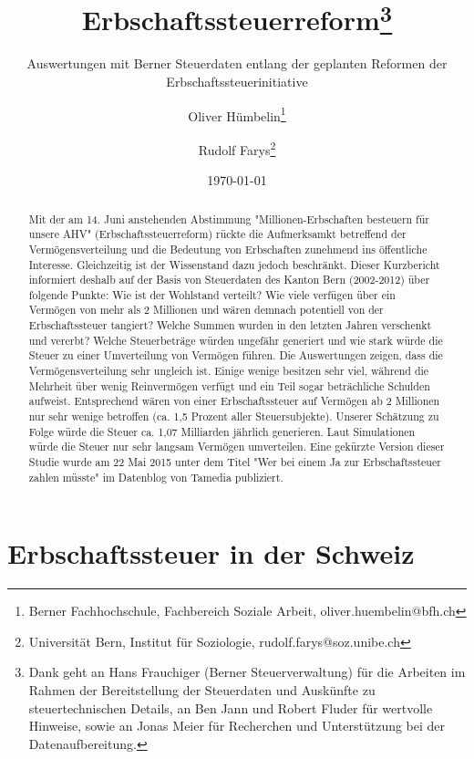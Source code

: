 \documentclass[a4paper, 12pt,liststotoc]{scrartcl}
\numberwithin{equation}{section}
\begin{document}
\title{Erbschaftssteuerreform\thanks{Dank geht an Hans Frauchiger (Berner
  Steuerverwaltung) für die Arbeiten im Rahmen der Bereitstellung der Steuerdaten und Auskünfte zu steuertechnischen Details, an Ben Jann und
  Robert Fluder für wertvolle Hinweise, sowie an Jonas Meier für
  Recherchen und Unterstützung bei der Datenaufbereitung.}}
\subtitle{Auswertungen mit Berner Steuerdaten entlang der geplanten Reformen der
Erbschaftssteuerinitiative}
\author{Oliver Hümbelin\thanks{Berner Fachhochschule, Fachbereich Soziale Arbeit, oliver.huembelin@bfh.ch} \and Rudolf Farys\thanks{Universität Bern, Institut für Soziologie, rudolf.farys@soz.unibe.ch}}
\date{\today}
\maketitle
\newpage

\begin{abstract}
Mit der am 14. Juni anstehenden Abstimmung "Millionen-Erbschaften besteuern für unsere AHV" (Erbschaftssteuerreform) rückte die Aufmerksamkt betreffend der Vermögensverteilung und die Bedeutung von Erbschaften zunehmend ins öffentliche Interesse. Gleichzeitig ist der Wissenstand dazu jedoch beschränkt. Dieser Kurzbericht informiert deshalb auf der Basis von Steuerdaten des Kanton Bern (2002-2012) über folgende Punkte: Wie ist der Wohlstand verteilt? Wie viele verfügen über ein Vermögen von mehr als 2 Millionen und wären demnach potentiell von der Erbschaftssteuer tangiert? Welche Summen wurden in den letzten Jahren verschenkt und vererbt? Welche Steuerbeträge würden ungefähr generiert und wie stark würde die Steuer zu einer Umverteilung von Vermögen führen. Die Auswertungen zeigen, dass die Vermögensverteilung sehr ungleich ist. Einige wenige besitzen sehr viel, während die Mehrheit über wenig Reinvermögen verfügt und ein Teil sogar beträchliche Schulden aufweist. Entsprechend wären von einer Erbschaftssteuer auf Vermögen ab 2 Millionen nur sehr wenige betroffen (ca. 1,5 Prozent aller Steuersubjekte). Unserer Schätzung zu Folge würde die Steuer ca. 1,07 Milliarden jährlich generieren. Laut Simulationen würde die Steuer nur sehr langsam Vermögen umverteilen. Eine gekürzte Version dieser Studie wurde am 22 Mai 2015 unter dem Titel "Wer bei einem Ja zur Erbschaftssteuer zahlen müsste" im Datenblog von Tamedia publiziert.
\end{abstract}
\newpage

\tableofcontents
\newpage

\section{Erbschaftssteuer in der
Schweiz}\label{erbschaftssteuer-in-der-schweiz}
\end{document}
